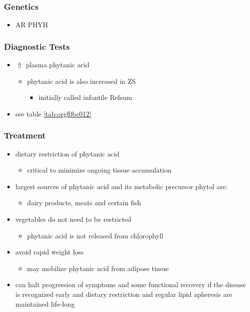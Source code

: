 \documentclass[12pt]{scrartcl}
\begin{document}
\subsubsection{Genetics}
\label{sec:orgb2e4054}
\begin{itemize}
\item AR PHYH
\end{itemize}

\subsubsection{Diagnostic Tests}
\label{sec:orge3fcc4c}
\begin{itemize}
\item \(\Uparrow\) plasma phytanic acid 
\begin{itemize}
\item phytanic acid is also increased in ZS
\begin{itemize}
\item initially called infantile Refsum
\end{itemize}
\end{itemize}
\item see table \ref{tab:orgf0bc012}
\end{itemize}
\subsubsection{Treatment}
\label{sec:orgdd4b55e}
\begin{itemize}
\item dietary restriction of phytanic acid 
\begin{itemize}
\item critical to minimize ongoing tissue accumulation
\end{itemize}
\item largest sources of phytanic acid and its metabolic precursor phytol are:
\begin{itemize}
\item dairy products, meats and certain fish
\end{itemize}
\item vegetables do not need to be restricted
\begin{itemize}
\item phytanic acid is not released from chlorophyll
\end{itemize}
\item avoid rapid weight loss
\begin{itemize}
\item may mobilize phytanic acid from adipose tissue
\end{itemize}
\item can halt progression of symptoms and some functional recovery if the
disease is recognized early and dietary restriction and regular
lipid apheresis are maintained life-long
\end{itemize}
\end{document}
